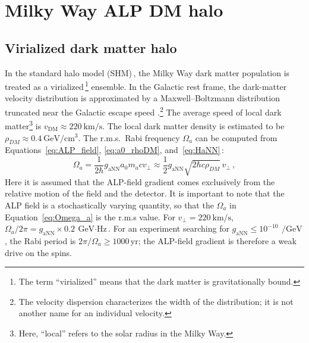 
\section{Milky Way ALP DM halo}\label{sec:theory:MWALP}

\subsection{Virialized dark matter halo}

In the standard halo model (SHM)\,\cite{Evans2019_SHMRefined}, the Milky Way dark matter population is treated as a virialized\,\footnote{The term ``virialized'' means that the dark matter is gravitationally bound. } ensemble. 
In the Galactic rest frame, the dark-matter velocity distribution is approximated by a Maxwell--Boltzmann distribution truncated near the Galactic escape speed \cite{Evans2019_SHMRefined}.\footnote{The velocity dispersion characterizes the width of the distribution; it is not another name for an individual velocity.}
The average speed of local dark matter\footnote{Here, ``local'' refers to the solar radius in the Milky Way.} is $v_\mathrm{DM} \approx \SI{220}{\km\per\s}$.
The local dark matter density is estimated to be $\rho_{DM}\approx\SI{0.4}{\GeV\per\centi\meter^3}$. 
The r.m.s.\ Rabi frequency $\Omega_a$ can be computed from Equations~\eqref{eq:ALP_field}, \eqref{eq:a0_rhoDM}, and~\eqref{eq:HaNN}\,\cite{Centers2021Stochastic}:
\begin{equation}
    \Omega_a
    = \dfrac{1}{2\hbar} g_{\mathrm{aNN}} a_0 m_a c v_{\bot}
    \approx \dfrac{1}{2} g_{\mathrm{aNN}}
    \sqrt{2\hbar c \rho_{DM}}\,v_{\bot}
    \,,
    \label{eq:Omega_a_MW}
\end{equation}
Here it is assumed that the ALP-field gradient comes exclusively from the relative motion of the field and the detector.
It is important to note that the ALP field is a stochastically varying quantity, so that the $\Omega_a$ in Equation~\eqref{eq:Omega_a} is the r.m.s value.
For $v_{\bot} = \SI{220}{\km\per\second}$, $\Omega_a/2\pi=g_{\mathrm{aNN}}\times\SI{0.2}{\GeV\cdot\Hz}$.
For an experiment searching for $g_{\mathrm{aNN}}\leq 10^{-10}\,\SI{}{\per\GeV}$, the Rabi period is $2\pi/\Omega_a \geq 1000\,\mathrm{yr}$; the ALP-field gradient is therefore a weak drive on the spins.


